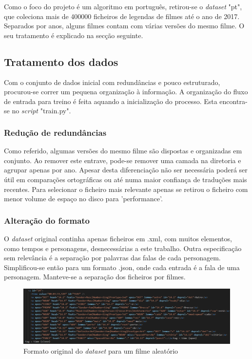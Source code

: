 \documentclass{article}
\begin{document}
Como o foco do projeto é um algoritmo em português, retirou-se o \textit{dataset} "pt", que coleciona mais de 400000 ficheiros de legendas de filmes até o ano de 2017. Separados por anos, alguns filmes contam com várias versões do mesmo filme. O seu tratamento é explicado na secção seguinte. 

\subsection{Tratamento dos dados}
Com o conjunto de dados inicial com redundâncias e pouco estruturado, procurou-se correr um pequena organização à informação. A organização do fluxo de entrada para treino é feita aquando a inicialização do processo. Esta encontra-se no \textit{script} "train.py".

\subsubsection{Redução de redundâncias}
Como referido, algumas versões do mesmo filme são dispostas e organizadas em conjunto. Ao remover este entrave, pode-se remover uma camada na diretoria e agrupar apenas por ano. Apesar desta diferenciação não ser necessária poderá ser útil em comparações ortográficas ou até numa maior confiança de traduções mais recentes. Para selecionar o ficheiro mais relevante apenas se retirou o ficheiro com menor volume de espaço no disco para 'performance'.

\subsubsection{Alteração do formato}
O \textit{dataset} original continha apenas ficheiros em .xml, com muitos elementos, como tempos e personagens, desnecessárias a este trabalho. Outra especificação sem relevância é a separação por palavras das falas de cada personagem. Simplificou-se então para um formato .json, onde cada entrada é a fala de uma personagem. Manteve-se a separação dos ficheiros por filmes.

\begin{figure}
	\centering
    \includegraphics[scale=0.3]{xml.png}
    \caption{Formato original do \textit{dataset} para um filme aleatório}
    \label{xmlimg}
\end{figure}
\end{document}
